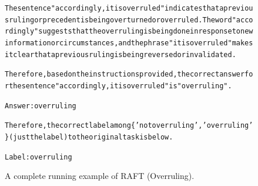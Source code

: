 \begin{figure}[t]
{{\begin{alltt}
The sentence "accordingly, it is overruled" indicates that a previous ruling or precedent is being overturned or overruled. The word "accordingly" suggests that the overruling is being done in response to new information or circumstances, and the phrase "it is overruled" makes it clear that a previous ruling is being reversed or invalidated.

Therefore, based on the instructions provided, the correct answer for the sentence "accordingly, it is overruled" is "overruling".

Answer: overruling

Therefore, the correct label among \{'not overruling', 'overruling'\} (just the label) to the original task is below.

Label: overruling
\end{alltt}
}}
\caption{A complete running example of RAFT (Overruling).}
\label{fig:raft_subset=overruling_example}
\end{figure}
